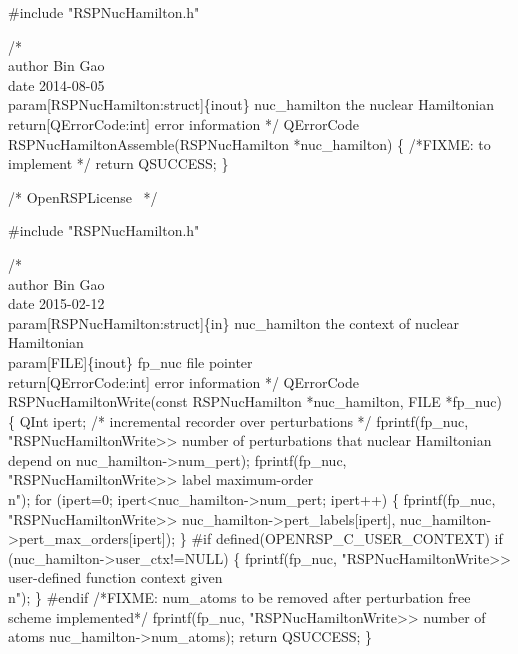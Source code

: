 #include "RSPNucHamilton.h"

/*%
    \\author Bin Gao
    \\date 2014-08-05
    \\param[RSPNucHamilton:struct]\{inout\} nuc_hamilton the nuclear Hamiltonian
    \\return[QErrorCode:int] error information
*/
QErrorCode RSPNucHamiltonAssemble(RSPNucHamilton *nuc_hamilton)
\{
/*FIXME: to implement */
    return QSUCCESS;
\}

\nwendcode{}\endmoddef
/*
  \LA{}OpenRSPLicense~{\nwtagstyle{}}\RA{}
*/

#include "RSPNucHamilton.h"

/*%
    \\author Bin Gao
    \\date 2015-02-12
    \\param[RSPNucHamilton:struct]\{in\} nuc_hamilton the context of nuclear Hamiltonian
    \\param[FILE]\{inout\} fp_nuc file pointer
    \\return[QErrorCode:int] error information
*/
QErrorCode RSPNucHamiltonWrite(const RSPNucHamilton *nuc_hamilton, FILE *fp_nuc)
\{
    QInt ipert;  /* incremental recorder over perturbations */
    fprintf(fp_nuc,
            "RSPNucHamiltonWrite>> number of perturbations that nuclear Hamiltonian depend on %
            nuc_hamilton->num_pert);
    fprintf(fp_nuc, "RSPNucHamiltonWrite>> label           maximum-order\\n");
    for (ipert=0; ipert<nuc_hamilton->num_pert; ipert++) \{
        fprintf(fp_nuc,
                "RSPNucHamiltonWrite>>       %
                nuc_hamilton->pert_labels[ipert],
                nuc_hamilton->pert_max_orders[ipert]);
    \}
#if defined(OPENRSP_C_USER_CONTEXT)
    if (nuc_hamilton->user_ctx!=NULL) \{
        fprintf(fp_nuc, "RSPNucHamiltonWrite>> user-defined function context given\\n");
    \}
#endif
/*FIXME: num_atoms to be removed after perturbation free scheme implemented*/
    fprintf(fp_nuc,
            "RSPNucHamiltonWrite>> number of atoms %
            nuc_hamilton->num_atoms);
    return QSUCCESS;
\}

